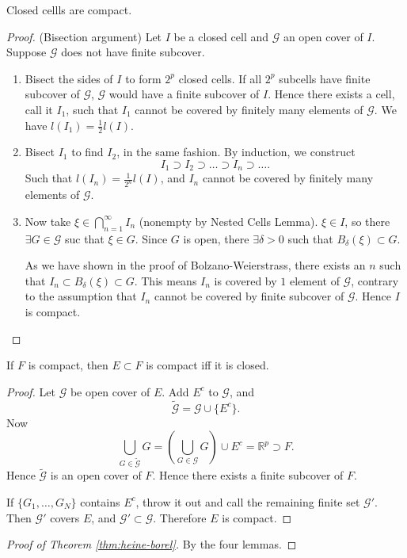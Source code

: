 \begin{lemma}
	Closed cellls are compact.
\end{lemma}
\begin{proof}
	(Bisection argument) Let $I$ be a closed cell and $\mathcal{G}$ an open cover of $I$.
	Suppose $\mathcal{G}$ does not have finite subcover.
	\begin{enumerate}
		\item Bisect the sides of $I$ to form $2^p$ closed cells. If all $2^p$ subcells have finite subcover of $\mathcal{G}$,  $\mathcal{G}$ would have a finite subcover of $I$.
			Hence there exists a cell, call it $I_1$, such that $I_1$ cannot be covered by finitely many elements of $\mathcal{G}$. We have $l(I_1) = \frac{1}{2}l(I)$.
		\item Bisect $I_1$ to find $I_2$, in the same fashion. By induction, we construct \[
			I_1 \supset I_2 \supset \ldots \supset I_n \supset \ldots
		.\] 
		Such that $l(I_n) = \frac{1}{2^n}l(I)  $, and $I_n$ cannot be covered by finitely many elements of $\mathcal{G}$.
		\item
		Now take $\xi \in \bigcap_{n=1} ^\infty I_n$ (nonempty by Nested Cells Lemma). $\xi \in I$, so there $\exists G \in \mathcal{G}$ suc that $\xi \in G$. Since $G$ is open, there $\exists \delta>0$ such that $B_\delta(\xi)\subset G$.

		As we have shown in the proof of Bolzano-Weierstrass, there exists an $n$ such that $I_n \subset B_\delta(\xi) \subset G$.
		This means $I_n$ is covered by $1$ element of $\mathcal{G}$, contrary to the assumption that $I_n$ cannot be covered by finite subcover of $\mathcal{G}$.
		Hence $I$ is compact.
	\end{enumerate}
\end{proof}

\begin{lemma}
	If $F$ is compact, then $E\subset F$ is compact iff it is closed.
\end{lemma}
\begin{proof}
	Let $\mathcal{G}$ be open cover of $E$. Add $E^c$ to $\mathcal{G}$, and  \[
		\tilde {\mathcal{G}} = \mathcal{G} \cup \{E^c\} 
	.\] 
	Now \[
		\bigcup_{G \in \tilde{\mathcal{G}}} G = \left( \bigcup_{G \in \mathcal{G}} G \right) \cup  E^c = \mathbb{R}^p \supset F
	.\] 
	Hence $\tilde{\mathcal{G}}$ is an open cover of $F$. Hence there exists a finite subcover of $F$.
	
	If $\{G_1, \ldots, G_N\} $ contains $E^c$, throw it out and call the remaining finite set $\mathcal{G}'$. Then $\mathcal{G}'$ covers $E$, and $\mathcal{G}' \subset \mathcal{G}$. Therefore $E$ is compact.
\end{proof}

\begin{proof}[Proof of Theorem \ref{thm:heine-borel}]
	By the four lemmas.
\end{proof}

